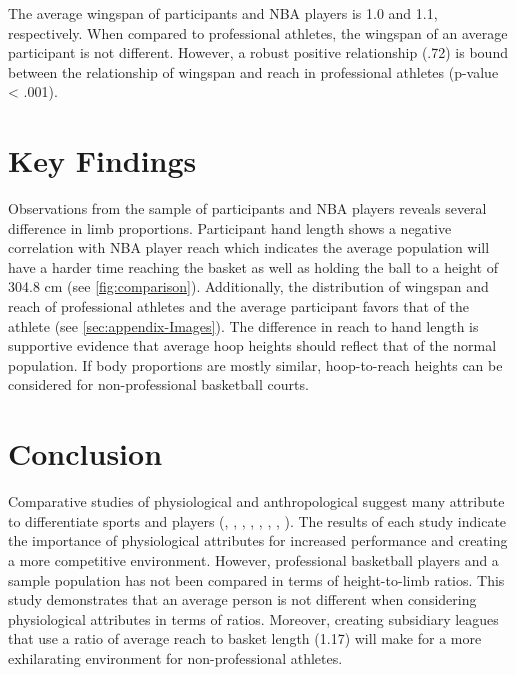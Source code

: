 \documentclass[]{article}
\begin{document}
The average wingspan of participants and NBA players is 1.0 and 1.1,
respectively. When compared to professional athletes, the wingspan of an
average participant is not different. However, a robust positive
relationship (.72) is bound between the relationship of wingspan and
reach in professional athletes (p-value \textless{} .001).

\section{Key Findings}
\label{sec:findings}

Observations from the sample of participants and NBA players reveals
several difference in limb proportions. Participant hand length shows a
negative correlation with NBA player reach which indicates the average
population will have a harder time reaching the basket as well as
holding the ball to a height of 304.8 cm (see \ref{fig:comparison}).
Additionally, the distribution of wingspan and reach of professional
athletes and the average participant favors that of the athlete (see
\ref{sec:appendix-Images}). The difference in reach to hand length is
supportive evidence that average hoop heights should reflect that of the
normal population. If body proportions are mostly similar, hoop-to-reach
heights can be considered for non-professional basketball courts.

\section{Conclusion}
\label{sec:conclusion}

Comparative studies of physiological and anthropological suggest many
attribute to differentiate sports and players (\citep{vaquera:2015},
\citep{masanovic:2018}, \citep{korkmaz:2020}, \citep{drinkwater:2008},
\citep{strumbelj:2014}, \citep{ljubojevic:2020}, \citep{gryko:2018},
\citep{bayios:2006}). The results of each study indicate the importance
of physiological attributes for increased performance and creating a
more competitive environment. However, professional basketball players
and a sample population has not been compared in terms of height-to-limb
ratios. This study demonstrates that an average person is not different
when considering physiological attributes in terms of ratios. Moreover,
creating subsidiary leagues that use a ratio of average reach to basket
length (1.17) will make for a more exhilarating environment for
non-professional athletes.

\newpage
\end{document}

